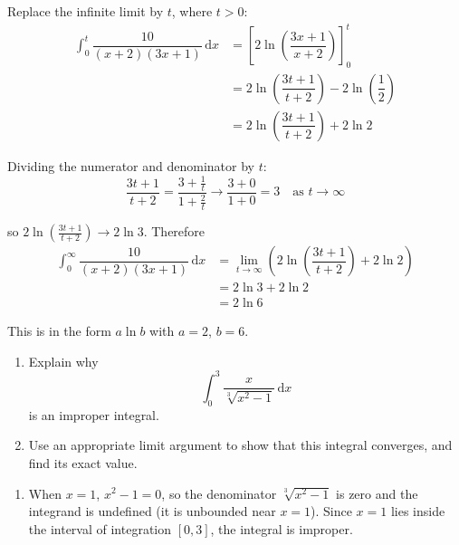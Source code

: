 \documentclass[leqno]{article}
\begin{document}
\begin{enumerate}[
  label=\textbf{\arabic*.},
  leftmargin=*,
  topsep=0pt,
  partopsep=0pt,
  parsep=0pt
]
\begin{djsSolution}
\begin{enumerate}[label=\textbf{(\alph*)}, start=1]
Replace the infinite limit by \(t\), where \(t>0\):
\begin{align*}
\int_0^t \dfrac{10}{(x+2)(3x+1)}\,\mathrm{d}x &= \left[2\ln\left(\dfrac{3x+1}{x+2}\right)\right]_0^t\\
&=2\ln\left(\dfrac{3t+1}{t+2}\right)-2\ln\left(\dfrac{1}{2}\right)\\
&=2\ln\left(\dfrac{3t+1}{t+2}\right)+2\ln 2
\end{align*}

Dividing the numerator and denominator by \(t\):
\[
\dfrac{3t+1}{t+2}=\dfrac{3+\frac{1}{t}}{1+\frac{2}{t}}\to\dfrac{3+0}{1+0}=3\quad\text{as } t\to\infty
\]

so \(2\ln\left(\frac{3t+1}{t+2}\right)\to 2\ln 3\). Therefore
\begin{align*}
\int_0^\infty \dfrac{10}{(x+2)(3x+1)}\,\mathrm{d}x &= \lim_{t\to\infty}\left(2\ln\left(\dfrac{3t+1}{t+2}\right)+2\ln 2\right)\\
&=2\ln 3+2\ln 2\\
&=2\ln 6
\end{align*}

This is in the form \(a\ln b\) with \(a=2\), \(b=6\).
\end{enumerate}
\end{djsSolution}

\newpage

\questionitem

\begin{enumerate}[label=\textbf{(\alph*)}]
  \item Explain why
  \[\int_0^3 \dfrac{x}{\sqrt[3]{x^2-1}}\,\mathrm{d}x\]
  is an improper integral.  \\
  \item Use an appropriate limit argument to show that this integral converges, and find its exact value.  \\
\end{enumerate}

\vspace*{10pt}

\begin{djsSolution}
\begin{enumerate}[label=\textbf{(\alph*)}, start=1]
  \item When \(x=1\), \(x^2-1=0\), so the denominator \(\sqrt[3]{x^2-1}\) is zero and the integrand is undefined (it is unbounded near \(x=1\)). Since \(x=1\) lies inside the interval of integration \([0,3]\), the integral is improper.


\end{enumerate}
\end{djsSolution}
\end{enumerate}
\end{document}
